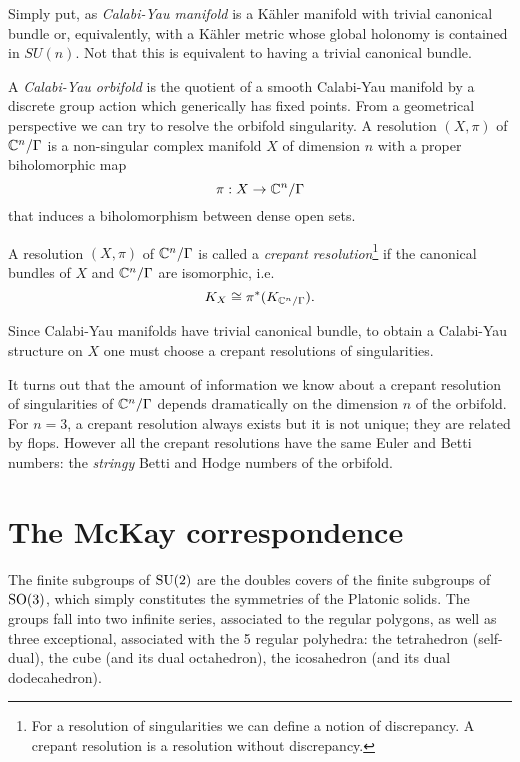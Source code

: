 \documentclass[a4paper,11pt]{article}
\begin{document}
    Simply put, as \emph{Calabi-Yau manifold} is a Kähler manifold with trivial canonical bundle or, equivalently, with a Kähler metric whose global holonomy is contained in $SU(n)$. Not that this is equivalent to having a trivial canonical bundle.

     A \emph{Calabi-Yau orbifold} is the quotient of a smooth Calabi-Yau manifold by a discrete group action which generically has fixed points. From a geometrical perspective we can try to resolve the orbifold singularity. A resolution $(X,\pi)$ of $\mathbb{C}^n/\Gamma$ is a non-singular complex manifold $X$ of dimension $n$ with a proper biholomorphic map 
    \begin{equation}
        \pi:X\to\mathbb{C}^n/\Gamma
    \end{equation}
    that induces a biholomorphism between dense open sets. 
    \begin{defn}
        A resolution $(X,\pi)$ of $\mathbb{C}^n/\Gamma$ is called a \emph{crepant resolution}\footnote{For a resolution of singularities we can define a notion of discrepancy. A crepant resolution is a resolution
        without discrepancy.} if the canonical bundles of $X$ and $\mathbb{C}^n/\Gamma$ are isomorphic, i.e.
        \begin{equation*}
            K_X\cong\pi^*(K_{\mathbb{C}^n/\Gamma}).
        \end{equation*}
    \end{defn}
    Since Calabi-Yau manifolds have trivial canonical bundle, to obtain a Calabi-Yau structure on $X$ one must choose a crepant resolutions of singularities.

    It turns out that the amount of information we know about a crepant resolution of singularities of $\mathbb{C}^n/\Gamma$ depends dramatically on the dimension $n$ of the orbifold. For $n=3$, a crepant resolution always exists but it is not unique; they are related by flops. However all the crepant resolutions have the same Euler and Betti numbers: the \emph{stringy} Betti and Hodge numbers of the orbifold.

\section{The McKay correspondence}

    The finite subgroups of $\text{SU}(2)$ are the doubles covers of the finite subgroups of $\text{SO}(3)$, which simply constitutes the symmetries of the Platonic solids. The groups fall into two infinite series, associated to the regular polygons, as well as three exceptional, associated with the 5 regular polyhedra: the tetrahedron (self-dual), the cube (and its dual octahedron), the icosahedron (and its dual dodecahedron).
\end{document}
